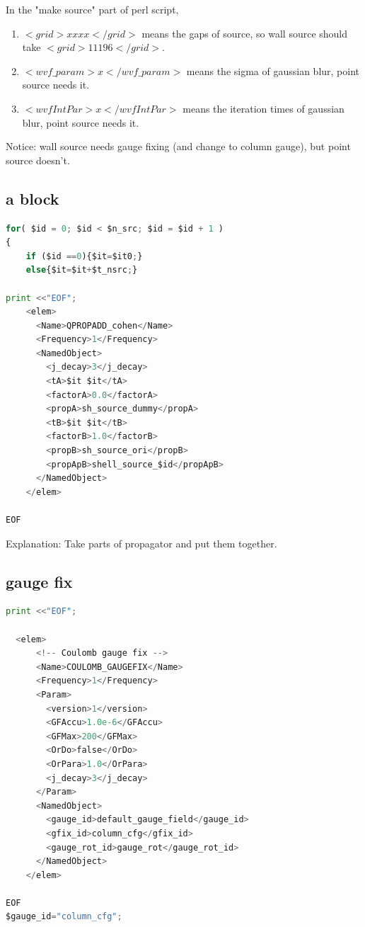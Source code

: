 \documentclass{article}
\begin{document}
In the "make source" part of perl script, 

\begin{enumerate}
  \item $<grid>xxxx</grid>$ means the gaps of source, so wall source should take $<grid>1 1 1 96</grid>$.
  \item $<wvf\_param>x</wvf\_param>$ means the sigma of gaussian blur, point source needs it.
  \item $<wvfIntPar>x</wvfIntPar>$ means the iteration times of gaussian blur, point source needs it.
\end{enumerate}

Notice: wall source needs gauge fixing (and change to column gauge), but point source doesn't.

\subsection{a block}

\begin{lstlisting}[language=Python]
for( $id = 0; $id < $n_src; $id = $id + 1 )
{
    if ($id ==0){$it=$it0;}
    else{$it=$it+$t_nsrc;} 

print <<"EOF";
    <elem>
      <Name>QPROPADD_cohen</Name>
      <Frequency>1</Frequency>
      <NamedObject>
        <j_decay>3</j_decay>
        <tA>$it $it</tA>
        <factorA>0.0</factorA>
        <propA>sh_source_dummy</propA>
        <tB>$it $it</tB>
        <factorB>1.0</factorB>
        <propB>sh_source_ori</propB>
        <propApB>shell_source_$id</propApB>
      </NamedObject>
    </elem>

EOF
\end{lstlisting}

Explanation:
Take parts of propagator and put them together.

\subsection{gauge fix}

\begin{lstlisting}[language=Python]
  print <<"EOF";

  <elem>
      <!-- Coulomb gauge fix -->
      <Name>COULOMB_GAUGEFIX</Name>
      <Frequency>1</Frequency>
      <Param>
        <version>1</version>
        <GFAccu>1.0e-6</GFAccu>
        <GFMax>200</GFMax>
        <OrDo>false</OrDo>
        <OrPara>1.0</OrPara>
        <j_decay>3</j_decay>
      </Param>
      <NamedObject>
        <gauge_id>default_gauge_field</gauge_id>
        <gfix_id>column_cfg</gfix_id>
        <gauge_rot_id>gauge_rot</gauge_rot_id>
      </NamedObject>
    </elem>

EOF
$gauge_id="column_cfg";
\end{lstlisting}
\end{document}

